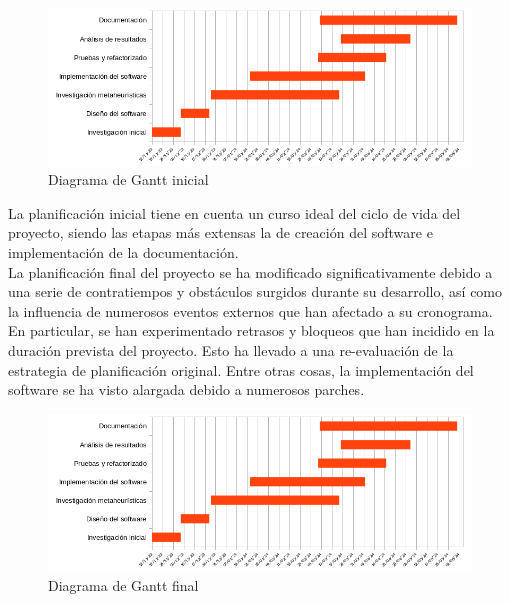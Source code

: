 \begin{figure}[H]
      \begin{center}
            \includegraphics[width=1\textwidth]{imagenes/gantt-init.png}
      \end{center}
      \caption{Diagrama de Gantt inicial}
\end{figure}

La planificación inicial tiene en cuenta un curso ideal del ciclo de vida del proyecto, siendo las etapas más extensas la de creación del software e implementación de la documentación.\\[6pt]
La planificación final del proyecto se ha modificado significativamente debido a una serie de contratiempos y obstáculos surgidos durante su desarrollo, así como la influencia de numerosos eventos externos que han afectado a su cronograma. En particular, se han experimentado retrasos y bloqueos que han incidido en la duración prevista del proyecto. Esto ha llevado a una re-evaluación de la estrategia de planificación original. Entre otras cosas, la implementación del software se ha visto alargada debido a numerosos parches.

\begin{figure}[H]
      \begin{center}
            \includegraphics[width=1\textwidth]{imagenes/gantt-init.png}
      \end{center}
      \caption{Diagrama de Gantt final}
\end{figure}

